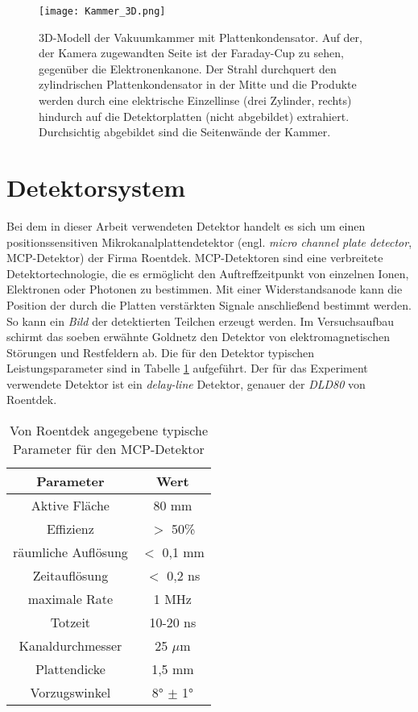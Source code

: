 \begin{figure}
    \centering
    \hspace{-2.4cm}\texttt{[image: Kammer\_3D.png]}
    \caption[3D-Modell der Vakuumkammer mit Plattenkondensator]{3D-Modell der Vakuumkammer mit Plattenkondensator. Auf der, der Kamera zugewandten Seite ist der Faraday-Cup zu sehen, gegenüber die Elektronenkanone. Der Strahl durchquert den zylindrischen Plattenkondensator in der Mitte und die Produkte werden durch eine elektrische Einzellinse (drei Zylinder, rechts) hindurch auf die Detektorplatten (nicht abgebildet) extrahiert. Durchsichtig abgebildet sind die Seitenwände der Kammer.}
    \label{fig:3D}
\end{figure}

\section{Detektorsystem}
Bei dem in dieser Arbeit verwendeten Detektor handelt es sich um einen positionssensitiven Mikrokanalplattendetektor (engl. \textit{micro channel plate detector}, MCP-Detektor) der Firma Roentdek. MCP-Detektoren sind eine verbreitete Detektortechnologie, die es ermöglicht den Auftreffzeitpunkt von einzelnen Ionen, Elektronen oder Photonen zu bestimmen. Mit einer Widerstandsanode kann die Position der durch die Platten verstärkten Signale anschließend bestimmt werden. So kann ein \textit{Bild} der detektierten Teilchen erzeugt werden. Im Versuchsaufbau schirmt das soeben erwähnte Goldnetz den Detektor von elektromagnetischen Störungen und Restfeldern ab. Die für den Detektor typischen Leistungsparameter sind in Tabelle \ref{tab:MCP} aufgeführt. Der für das Experiment verwendete Detektor ist ein \textit{delay-line} Detektor, genauer der \textit{DLD80} von Roentdek.

\begin{table}[h]
    \centering
    \caption{Von Roentdek angegebene typische Parameter für den MCP-Detektor}
    \begin{tabular}{c|c}
        Parameter & Wert \\
        \hline
        Aktive Fläche & 80 mm \\
        Effizienz & $>$ 50\% \\
        räumliche Auflösung & $<$ 0,1 mm \\
        Zeitauflösung & $<$ 0,2 ns \\
        maximale Rate & 1 MHz \\
        Totzeit & 10-20 ns \\
        Kanaldurchmesser & 25 $\mu$m \\
        Plattendicke & 1,5 mm \\
        Vorzugswinkel & \ang{8} $\pm$ \ang{1} \\

    \end{tabular}
    \label{tab:MCP}
\end{table}

